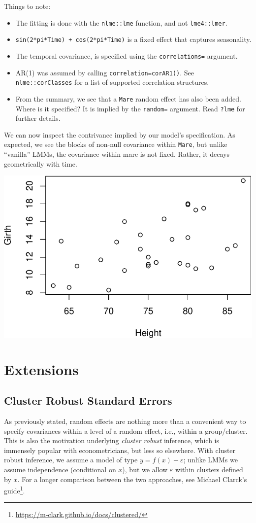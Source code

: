 \documentclass[]{book}
\providecommand{\tightlist}{%
  \setlength{\itemsep}{0pt}\setlength{\parskip}{0pt}}
\renewcommand{\href}[2]{#2\footnote{\url{#1}}}
\theoremstyle{definition}
\theoremstyle{definition}
\theoremstyle{definition}
\theoremstyle{remark}
\begin{document}
Things to note:

\begin{itemize}
\tightlist
\item
  The fitting is done with the \texttt{nlme::lme} function, and not \texttt{lme4::lmer}.
\item
  \texttt{sin(2*pi*Time)\ +\ cos(2*pi*Time)} is a fixed effect that captures seasonality.
\item
  The temporal covariance, is specified using the \texttt{correlations=} argument.
\item
  AR(1) was assumed by calling \texttt{correlation=corAR1()}. See \texttt{nlme::corClasses} for a list of supported correlation structures.
\item
  From the summary, we see that a \texttt{Mare} random effect has also been added. Where is it specified? It is implied by the \texttt{random=} argument. Read \texttt{?lme} for further details.
\end{itemize}

We can now inspect the contrivance implied by our model's specification.
As expected, we see the blocks of non-null covariance within \texttt{Mare}, but unlike ``vanilla'' LMMs, the covariance within mare is not fixed. Rather, it decays geometrically with time.

\includegraphics[width=0.5\linewidth]{Rcourse_files/figure-latex/unnamed-chunk-206-1}

\hypertarget{extensions-1}{%
\section{Extensions}\label{extensions-1}}

\hypertarget{cr-se}{%
\subsection{Cluster Robust Standard Errors}\label{cr-se}}

As previously stated, random effects are nothing more than a convenient way to specify covariances within a level of a random effect, i.e., within a group/cluster.
This is also the motivation underlying \emph{cluster robust} inference, which is immensely popular with econometricians, but less so elsewhere.
With cluster robust inference, we assume a model of type \(y=f(x)+\varepsilon\); unlike LMMs we assume independence (conditional on \(x\)), but we allow \(\varepsilon\) within clusters defined by \(x\).
For a longer comparison between the two approaches, see \href{https://m-clark.github.io/docs/clustered/}{Michael Clarck's guide}.
\end{document}
